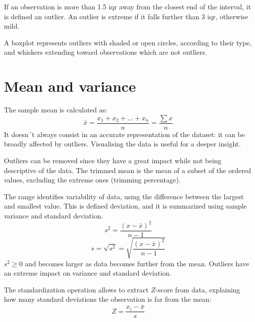 If an observation is more than 1.5 iqr away from the closest end of the interval, it is defined an outlier. An outlier is extreme if it falls further than 3 iqr, otherwise mild. 

A boxplot represents outliers with shaded or open circles, according to their type, and whiskers extending toward observations which are not outliers.

\section{Mean and variance}
The sample mean is calculated as:
$$\bar{x} = \frac{x_1 + x_2 + \dots + x_n }{n} = \frac{\sum x}{n}$$
It doesn´t always consist in an accurate representation of the dataset: it can be broadly affected by outliers. Visualising the data is useful for a deeper insight.

Outliers can be removed since they have a great impact while not being descriptive of the data. The trimmed mean is the mean of a subset of the ordered values, excluding the extreme ones (trimming percentage).

The range identifies variability of data, using the difference between the largest and smallest value. This is defined deviation, and it is summarized using sample variance and standard deviation.
$$s^2 = \frac{(x - \bar{x})^2}{n - 1}$$
$$s = \sqrt{s^2} = \sqrt{\frac{(x - \bar{x})^2}{n - 1}}$$
$s^2 \geq 0$ and becomes larger as data becomes further from the mean. Outliers have an extreme impact on variance and standard deviation.

The standardization operation allows to extract $Z$-score from data, explaining how many standard deviations the observation is far from the mean:
$$Z = \frac{x_i - \bar{x}}{s}$$

